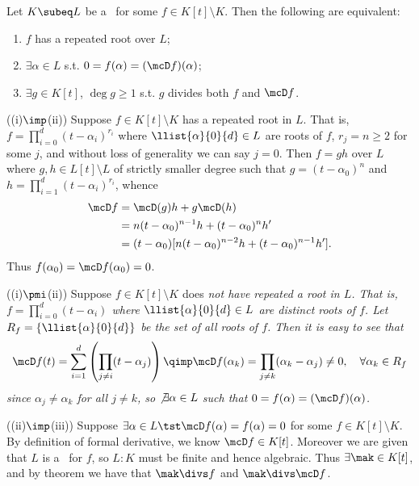 \documentclass{article}
\begin{document}
\setcounter{section}{8} %
\begin{exercise} %
  \label{qs:one}
  Let \( K\subeq L \) be a \sfe~for some \( f\in K[t]\setminus K \).
  Then the following are equivalent: \begin{enumerate}[label=(\roman*)]
    \item \( f \) has a repeated root over \( L \);
    \item \( \exists \alpha\in L \) s.t. \( 0=f(\alpha)=(\mcD f)(\alpha) \);
    \item \( \exists g\in K[t] \), \( \deg g \geq 1 \) s.t. \( g \) divides both \( f \) and \( \mcD f \).
  \end{enumerate}
\end{exercise}
\begin{solution}
((i)\( \imp \)(ii)) Suppose \( f \in K[t]\setminus K \) has a repeated root in \( L \).
That is, \( f = \prod_{i=0}^{d}(t-\alpha_i)^{r_i} \) where \( \llist{\alpha}{0}{d} \in L \) are roots of \( f \), \( r_j = n \geq 2 \) for some \( j \), and without loss of generality we can say \( j=0 \).
Then \( f=gh \) over \( L \) where \( g,h\in L[t]\setminus L \) of strictly smaller degree such that \( g=(t-\alpha_0)^n \) and \( h=\prod_{i=1}^{d}(t-\alpha_i)^{r_i} \), whence
\begin{align*}
\mcD f &= \mcD(g)h + g\mcD(h)\\
        &= n(t-\alpha_0)^{n-1}h + (t-\alpha_0)^{n}h' \\
        &= (t-\alpha_0)[n(t-\alpha_0)^{n-2}h + (t-\alpha_0)^{n-1}h'].
\end{align*}
Thus \( f(\alpha_0) = \mcD f(\alpha_0) = 0 \).

((i)\( \pmi \)(ii)) Suppose \( f \in K[t]\setminus K \) does \it{not} have repeated a root in \( L \).
That is, \( f = \prod_{i=0}^{d}(t-\alpha_i) \) where \( \llist{\alpha}{0}{d} \in L \) are distinct roots of \( f \).
Let \( R_f = \{\llist{\alpha}{0}{d}\} \) be the set of all roots of \( f \).
Then it is easy to see that \begin{align*}
  \mcD f(t) = \sum_{i=1}^{d}\left(\prod_{j\neq i} (t-\alpha_j)\right) \qimp \mcD f(\alpha_k) = \prod_{j\neq k} (\alpha_k-\alpha_j) \neq 0, \quad\forall \alpha_k\in R_f
\end{align*}
since \( \alpha_j\neq \alpha_k \) for all \( j\neq k \), so \( \not\exists \alpha\in L \) such that \( 0=f(\alpha)=(\mcD f)(\alpha) \).

((ii)\( \imp \)(iii)) Suppose \(\exists\alpha\in L \tst \mcD f(\alpha)=f(\alpha)=0 \) for some \( f\in K[t]\setminus K \).
By definition of formal derivative, we know \( \mcD f \in K[t] \).
Moreover we are given that \( L \) is a \sfe~for \( f \), so \( L:K \) must be finite and hence algebraic.
Thus \( \exists\mak\in K[t] \), and by theorem we have that \( \mak\divs f \) and \( \mak \divs \mcD f \).


\end{solution}
\end{document}
